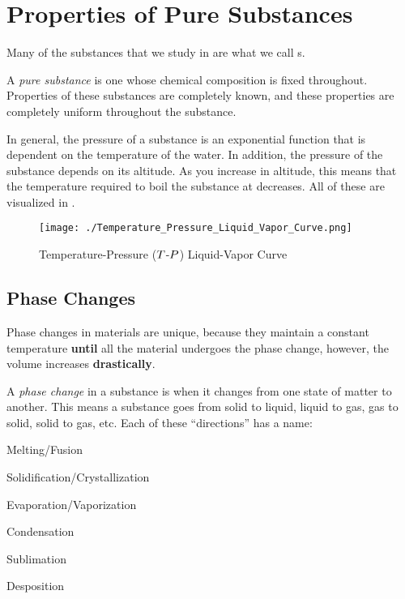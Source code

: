 \section{Properties of Pure Substances}\label{sec:Properties_Pure_Substances}
Many of the substances that we study in  are what we call s.

\begin{definition}\label{def:Pure_Substance}
  A \emph{pure substance} is one whose chemical composition is fixed throughout.
  Properties of these substances are completely known, and these properties are completely uniform throughout the substance.
\end{definition}

In general, the pressure of a substance is an exponential function that is dependent on the temperature of the water.
In addition, the pressure of the substance depends on its altitude.
As you increase in altitude, this means that the temperature required to boil the substance at decreases.
All of these are visualized in .

\begin{figure}[h!tbp]
  \centering
  \texttt{[image: ./Temperature\_Pressure\_Liquid\_Vapor\_Curve.png]}
  \caption{Temperature-Pressure ($T$-$P$) Liquid-Vapor Curve}
  \label{fig:Temp_Pressure_Liquid_Vapor_Curve}
\end{figure}

\subsection{Phase Changes}\label{subsec:Phase_Changes}
Phase changes in materials are unique, because they maintain a constant temperature \textbf{until} all the material undergoes the phase change, however, the volume increases \textbf{drastically}.

\begin{definition}\label{def:Phase_Change}
  A \emph{phase change} in a substance is when it changes from one state of matter to another.
  This means a substance goes from solid to liquid, liquid to gas, gas to solid, solid to gas, etc.
  Each of these ``directions'' has a name:
  \begin{description}[noitemsep]
  \item[Solid to Liquid:] Melting/Fusion
  \item[Liquid to Solid:] Solidification/Crystallization
  \item[Liquid to Gas:] Evaporation/Vaporization
  \item[Gas to Liquid:] Condensation
  \item[Solid to Gas:] Sublimation
  \item[Gas to Solid:] Desposition
  \end{description}
\end{definition}


